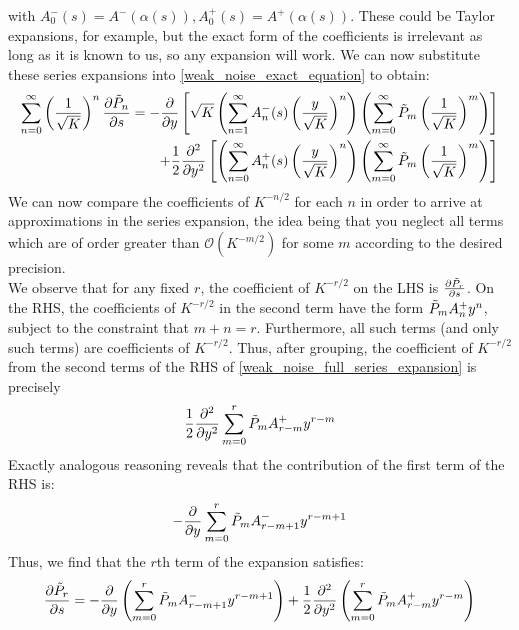 with $A^-_0(s) = A^-(\alpha(s)), A^+_0(s) = A^+(\alpha(s))$. These could be Taylor expansions, for example, but the exact form of the coefficients is irrelevant as long as it is known to us, so any expansion will work. We can now substitute these series expansions into \eqref{weak_noise_exact_equation} to obtain:
\begin{equation}
\begin{split}
\label{weak_noise_full_series_expansion}
\sum\limits_{n=0}^{\infty}\left(\frac{1}{\sqrt{K}}\right)^n\frac{\partial \Tilde{P}_n}{\partial s} = 
-\frac{\partial}{\partial y}\left[\sqrt{K}\left( \sum\limits_{n=1}^{\infty}A^-_n(s)\left(\frac{y}{\sqrt{K}}\right)^n\right)\left(\sum\limits_{m=0}^{\infty}\Tilde{P}_m\left(\frac{1}{\sqrt{K}}\right)^m\right)\right] \\ + 
\frac{1}{2}\frac{\partial^2}{\partial y^2}\left[\left(\sum\limits_{n=0}^{\infty}A^+_n(s)\left(\frac{y}{\sqrt{K}}\right)^n\right)\left(\sum\limits_{m=0}^{\infty}\Tilde{P}_m\left(\frac{1}{\sqrt{K}}\right)^m\right)\right]
\end{split}
\end{equation}
We can now compare the coefficients of $K^{-n/2}$ for each $n$ in order to arrive at approximations in the series expansion, the idea being that you neglect all terms which are of order greater than $\mathcal{O}(K^{-m/2})$ for some $m$ according to the desired precision.\\
We observe that for any fixed $r$, the coefficient of $K^{-r/2}$ on the LHS is $\frac{\partial \Tilde{P}_r}{\partial s}$. On the RHS, the coefficients of $K^{-r/2}$ in the second term have the form $\Tilde{P}_{m}A^+_{n}y^n$, subject to the constraint that $m+n=r$. Furthermore, all such terms (and only such terms) are coefficients of $K^{-r/2}$. Thus, after grouping, the coefficient of $K^{-r/2}$ from the second terms of the RHS of \eqref{weak_noise_full_series_expansion} is precisely
\begin{equation*}
    \frac{1}{2}\frac{\partial^2}{\partial y^2}\sum\limits_{m=0}^{r}\Tilde{P}_{m}A^+_{r-m}y^{r-m}
\end{equation*}
Exactly analogous reasoning reveals that the contribution of the first term of the RHS is:
\begin{equation*}
    -\frac{\partial}{\partial y}\sum\limits_{m=0}^{r}\Tilde{P}_{m}A^-_{r-m+1}y^{r-m+1}
\end{equation*}
Thus, we find that the $r$th term of the expansion satisfies:
\begin{equation}
\label{weak_noise_expansion_each_term}
\frac{\partial \Tilde{P}_r}{\partial s} = -\frac{\partial}{\partial y}\left(\sum\limits_{m=0}^{r}\Tilde{P}_{m}A^-_{r-m+1}y^{r-m+1}\right) + \frac{1}{2}\frac{\partial^2}{\partial y^2}\left(\sum\limits_{m=0}^{r}\Tilde{P}_{m}A^+_{r-m}y^{r-m}\right)
\end{equation}
